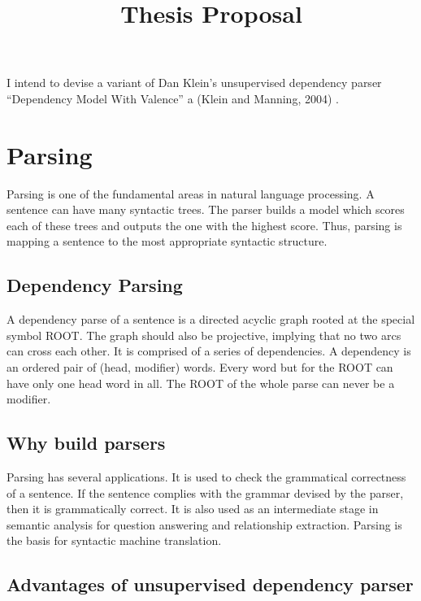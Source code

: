\documentclass{article}
\begin{document}
\title{Thesis Proposal}

\maketitle

I intend to devise a variant of Dan Klein's unsupervised dependency parser ``Dependency Model With Valence'' a (Klein and Manning, 2004) \cite{klein2004}.

\section{Parsing}

Parsing is one of the fundamental areas in natural language processing. A sentence can have many syntactic trees. The parser builds a model which scores each of these trees and outputs the one with the highest score. Thus, parsing is mapping a sentence to the most appropriate syntactic structure.

\subsection{Dependency Parsing}

A dependency parse of a sentence is a directed acyclic graph rooted at the special symbol ROOT. The graph should also be projective, implying that no two arcs can cross each other. It is comprised of a series of dependencies. A dependency is an ordered pair of (head, modifier) words. Every word but for the ROOT can have only one head word in all. The ROOT of the whole parse can never be a modifier.

\subsection{Why build parsers}

Parsing has several applications. It is used to check the grammatical correctness of a sentence. If the sentence complies with the grammar devised by the parser, then it is grammatically correct. It is also used as an intermediate stage in semantic analysis for question answering and relationship extraction. Parsing is the basis for syntactic machine translation.

\subsection{Advantages of unsupervised dependency parser}
\end{document}
